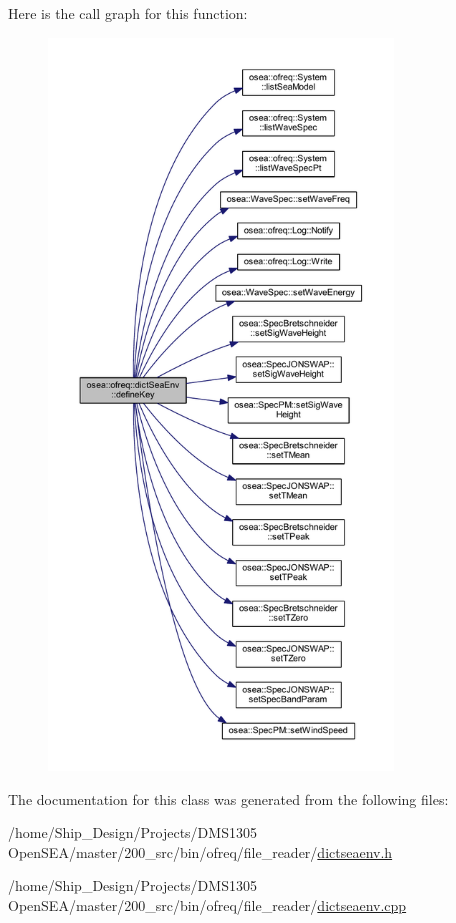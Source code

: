 Here is the call graph for this function\-:
\nopagebreak
\begin{figure}[H]
\begin{center}
\leavevmode
\includegraphics[height=550pt]{classosea_1_1ofreq_1_1dict_sea_env_a40ff29cc136e2920e6af22e0f49e6147_cgraph}
\end{center}
\end{figure}




The documentation for this class was generated from the following files\-:\begin{DoxyCompactItemize}
\item 
/home/\-Ship\-\_\-\-Design/\-Projects/\-D\-M\-S1305 Open\-S\-E\-A/master/200\-\_\-src/bin/ofreq/file\-\_\-reader/\hyperlink{dictseaenv_8h}{dictseaenv.\-h}\item 
/home/\-Ship\-\_\-\-Design/\-Projects/\-D\-M\-S1305 Open\-S\-E\-A/master/200\-\_\-src/bin/ofreq/file\-\_\-reader/\hyperlink{dictseaenv_8cpp}{dictseaenv.\-cpp}\end{DoxyCompactItemize}
